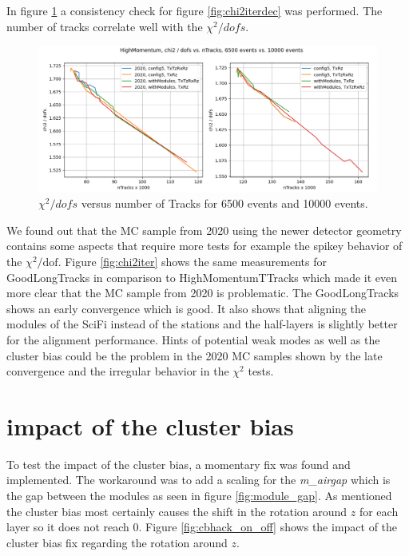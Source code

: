In figure \ref{fig:chi2tracksdec} a consistency check for figure
\ref{fig:chi2iterdec} was performed. The number of tracks correlate well with
the $\chi^2 / dofs$.

\begin{figure}
  \centering
  \includegraphics[width=\textwidth]{plots/LHCB_week_dec/chi2_vs_tracks_normal.png}
  \caption{$\chi^2 / dofs$ versus number of Tracks for 6500 events and 10000 events.}
  \label{fig:chi2tracksdec}
\end{figure}

We found out that the MC sample from 2020 using the newer detector geometry contains some aspects that require more tests for example the spikey behavior of the $\chi^2 / \text{dof}$. Figure \ref{fig:chi2iter} shows the same measurements for GoodLongTracks in comparison to HighMomentumTTracks which made it even more clear that the MC sample from 2020 is problematic. The GoodLongTracks shows an early convergence which is good. It also shows that aligning the modules of the SciFi instead of the stations and the half-layers is slightly better for the alignment performance. Hints of potential weak modes as well as the cluster bias could be the problem in the 2020 MC samples shown by the late convergence and the irregular behavior in the $\chi^2$ tests.

\section{impact of the cluster bias}
\label{sec:clusterbias}

To test the impact of the cluster bias, a momentary fix was found and implemented. The workaround was to add a scaling for the \textit{m\_airgap}\cite{gap} which is the gap between the modules as seen in figure \ref{fig:module_gap}.
As mentioned the cluster bias most certainly causes the shift in the rotation around $z$ for each layer so it does not reach 0.
Figure \ref{fig:cbhack_on_off} shows the impact of the cluster bias fix regarding the rotation around $z$.

